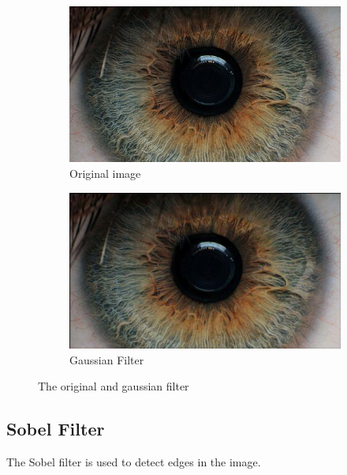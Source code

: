 \documentclass{article}
\begin{document}
%
%
\begin{figure}[H]
\centering

\begin{subfigure}{.5\textwidth}
  \centering
  \includegraphics[width=0.9\linewidth]{res/index.jpg}
  \caption{Original image}
  \label{fig:original_img}
\end{subfigure}%
\begin{subfigure}{.5\textwidth}
  \centering
  \includegraphics[width=0.9\linewidth]{res/gaussian.jpg}
  \caption{Gaussian Filter}
  \label{fig:gray_img}
\end{subfigure}

\caption{The original and gaussian filter}
\label{fig:result_gauss}
\end{figure}



\subsection{Sobel Filter}
The Sobel filter is used to detect edges in the image.
\end{document}

